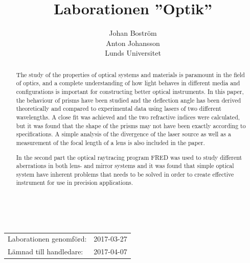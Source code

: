 \documentclass[a4paper]{article}
\title{Laborationen ”Optik”}
\author{Johan Boström\\Anton Johansson\\Lunds Universitet}
\makeatletter
\renewcommand*\maketitle{
  {
    \begin{center}
      {\huge\bfseries \@title}\\
      \vspace{5mm}
      {\large \@author}
    \end{center}
    \vspace{2mm}
  }
}
\makeatother
\begin{document}
\maketitle

\renewcommand{\abstractname}{Abstract} %

\begin{abstract}
  
  The study of the properties of optical systems and materials is paramount in the field of optics, and a complete understanding of how light behaves in different media and configurations is important for constructing better optical instruments. In this paper, the behaviour of prisms have been studied and the deflection angle has been derived theoretically and compared to experimental data using lasers of two different wavelengths. A close fit was achieved and the two refractive indices were calculated, but it was found that the shape of the prisms may not have been exactly according to specifications. A simple analysis of the divergence of the laser source as well as a measurement of the focal length of a lens is also included in the paper.
  
  In the second part the optical raytracing program FRED was used to study different aberrations in both lens- and mirror systems and it was found that simple optical system have inherent problems that needs to be solved in order to create effective instrument for use in precision applications.
  
\end{abstract}

\vspace{2mm}

\hspace{-3mm}
\begin{tabular}{ll}
Laborationen genomförd: &	2017-03-27 \\
Lämnad till handledare: &	2017-04-07 \\
\end{tabular}
\end{document}

